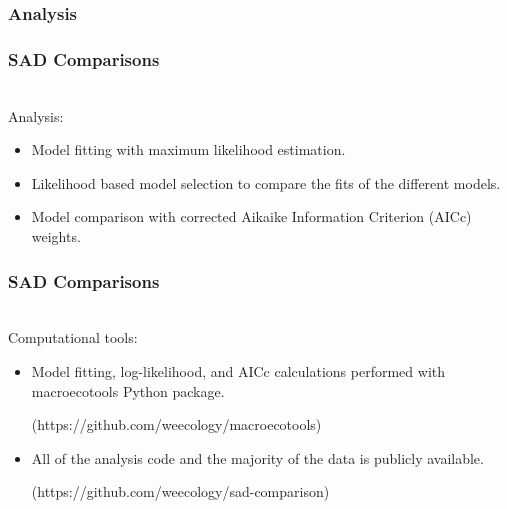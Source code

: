 \documentclass[14pt]{beamer}
\begin{document}
\subsubsection{Analysis}
\begin{frame}
\frametitle{SAD Comparisons}
~\\
Analysis:
\begin{itemize}
\item Model fitting with maximum likelihood estimation. 
\item Likelihood based model selection to compare the fits of the different models.
\item Model comparison with corrected Aikaike Information Criterion (AICc) weights.
\end{itemize}
\end{frame}

\begin{frame}
\frametitle{SAD Comparisons}
~\\
Computational tools:
\begin{itemize}
\item Model fitting, log-likelihood, and AICc calculations performed with macroecotools Python package.\\
\begin{small}
(https://github.com/weecology/macroecotools)
\end{small}
\item All of the analysis code and the majority of the data is publicly available.
\begin{small}
(https://github.com/weecology/sad-comparison)
\end{small}
\end{itemize}
\end{frame}
\end{document}
